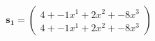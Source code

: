 \documentclass[preview]{standalone}
\begin{document}
\begin{align*}
\mathbf{s_1} = \begin{pmatrix}4 + -1x^{1} + 2x^{2} + -8x^{3} \\ 4 + -1x^{1} + 2x^{2} + -8x^{3}\end{pmatrix}
\end{align*}
\end{document}
